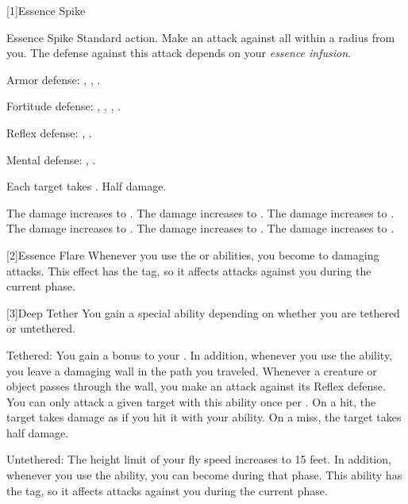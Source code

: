     [1]{Essence Spike}
      \begin{magicalactiveability}{Essence Spike}
        \abilityusagetime Standard action.
        \rankline
        Make an attack against all  within a \smallarea radius from you.
        The defense against this attack depends on your \textit{essence infusion}.
        \begin{raggeditemize}
          \item Armor defense: \atAir, \atEarth, \atWater.
          \item Fortitude defense: \atAcid, \atAuditory, \atCold, \atElectricity.
          \item Reflex defense: \atFire, \atVisual.
          \item Mental defense: \atCompulsion, \atEmotion.
        \end{raggeditemize}
        \hit Each target takes \damagerankone.
        \miss Half damage.

        \rankline
         The damage increases to \damageranktwo.
         The damage increases to \damagerankthree.
         The damage increases to \damagerankfour.
         The damage increases to \damagerankfive.
         The damage increases to \damageranksix.
         The damage increases to \damagerankseven.
      \end{magicalactiveability}

    [2]{Essence Flare} Whenever you use the  or  abilities, you  become \impervious to damaging attacks.
      This effect has the  tag, so it affects attacks against you during the current phase.

    [3]{Deep Tether} You gain a special ability depending on whether you are tethered or untethered.
      \begin{raggeditemize}
        \item Tethered: You gain a  bonus to your .
          In addition, whenever you use the  ability, you leave a damaging wall in the path you traveled.
          Whenever a creature or object passes through the wall, you make an attack against its Reflex defense.
          You can only attack a given target with this ability once per .
          On a hit, the target takes damage as if you hit it with your  ability.
          On a miss, the target takes half damage.
        \item Untethered: The height limit of your fly speed increases to 15 feet.
          In addition, whenever you use the  ability, you can become  during that phase.
          This ability has the  tag, so it affects attacks against you during the current phase.
      \end{raggeditemize}

